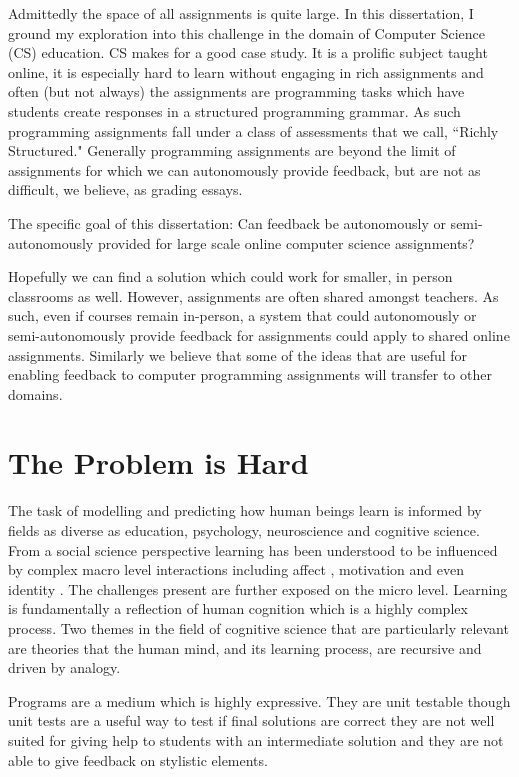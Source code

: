 Admittedly the space of all assignments is quite large. In this dissertation, I ground my exploration into this challenge in the domain of Computer Science (CS) education. CS makes for a good case study. It is a prolific subject taught online, it is especially hard to learn without engaging in rich assignments and often (but not always) the assignments are programming tasks which have students create responses in a structured programming grammar. As such programming assignments fall under a class of assessments that we call, ``Richly Structured." Generally programming assignments are beyond the limit of assignments for which we can autonomously provide feedback, but are not as difficult, we believe, as grading essays.

\begin{mdframed}
The specific goal of this dissertation: Can feedback be autonomously or semi-autonomously provided for large scale online computer science assignments?
\end{mdframed}

Hopefully we can find a solution which could work for smaller, in person classrooms as well. However, assignments are often shared amongst teachers. As such, even if courses remain in-person, a system that could autonomously or semi-autonomously provide feedback for assignments could apply to shared online assignments. Similarly we believe that some of the ideas that are useful for enabling feedback to computer programming assignments will transfer to other domains.	

\section{The Problem is Hard}

The task of modelling and predicting how human beings learn is informed by fields as diverse
as education, psychology, neuroscience and cognitive science. From a social science perspective
learning has been understood to be influenced by complex macro level interactions including affect \cite{}
, motivation \cite{} and even identity \cite{}. The challenges present are further exposed on the micro
level. Learning is fundamentally a reflection of human cognition which is a highly complex process.
Two themes in the field of cognitive science that are particularly relevant are theories that the human
mind, and its learning process, are recursive and driven by analogy.

Programs are a medium which is highly expressive. They are unit testable though unit tests are a useful way to test if final solutions are correct they are not well suited for giving help to students with an intermediate solution and they are not able to give feedback on stylistic elements.

